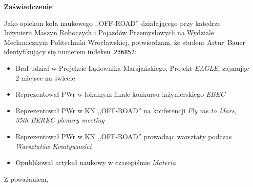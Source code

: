 \documentclass[11pt,a4paper]{letter} %
\date{Wrocław, 20 września 2018}
\begin{document}
\begin{letter}{}
\opening{}

\begin{center}
  \huge
  \textbf{Zaświadczenie}
\end{center}

 Jako opiekun koła naukowego ,,OFF-ROAD'' działającego przy katedrze Inżynierii Maszyn Roboczych i Pojazdów Przemysłowych na Wydziale Mechanicznym Politechniki Wrocławskiej, potwierdzam, że student Artur~Bauer identyfikujący się numerem indeksu~\texttt{236852}:
\begin{itemize}
    \item Brał udział w Projekcie Lądownika Marsjańskiego, Projekt \textit{EAGLE}, zajmując 2 miejsce na świecie
    \item Reprezentował PWr w lokalnym finale konkursu inżynierskiego \textit{EBEC}
    \item Reprezentował PWr w KN ,,OFF-ROAD'' na konferencji \textit{Fly me to Mars}, \textit{35th BEREC plenary meeting}
    \item Reprezentował PWr w KN ,,OFF-ROAD'' prowadząc warsztaty podczas \textit{Warsztatów Kreatywności} 
    \item Opublikował artykuł naukowy w czasopiśmie \textit{Materia}
\end{itemize}
\closing{Z poważaniem,}

\end{letter}
\end{document}
